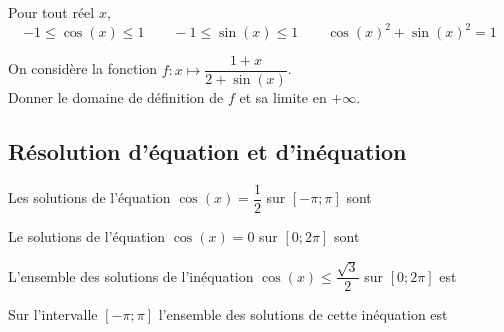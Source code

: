 \documentclass[11pt,fleqn, openany]{book} %
\begin{document}
\begin{proposition}
Pour tout réel $x$,
\[-1\leqslant \cos(x) \leqslant 1 \qquad -1\leqslant \sin(x) \leqslant 1 \qquad \cos(x)^2+\sin(x)^2=1\]
\vspace{-0.5cm}\end{proposition}


\begin{example}On considère la fonction $f:x \mapsto \dfrac{1+x}{2+\sin(x)}$.\\ Donner le domaine de définition de $f$ et sa limite en $+\infty$.

\vskip140pt
\end{example}


\subsection{Résolution d'équation et d'inéquation}

\begin{example}Les solutions de l'équation $\cos(x)=\dfrac{1}{2}$ sur $[-\pi;\pi]$ sont \end{example}

\begin{example}Le solutions de l'équation $\cos(x)=0$ sur $[0;2\pi]$ sont \end{example}



\begin{example}L'ensemble des solutions de l'inéquation $\cos(x) \leqslant \dfrac{\sqrt{3}}{2}$ sur $[0;2\pi]$ est
\vskip10pt

Sur l'intervalle $[-\pi;\pi]$ l'ensemble des solutions de cette inéquation est \end{example}



\begin{center}

\end{center}
\end{document}
